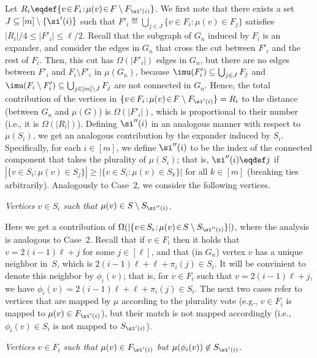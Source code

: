 Let $R_i\eqdef\{v\!\in\!F_i\!:\!\mu(v)\!\in\!F\setminus F_{\si'(i)}\}$.
We first note that there exists a set $J\subseteq[m]\setminus\{\si'(i)\}$
such that $F'_i\eqdef\bigcup_{j\in J}\{v\!\in\!F_i\!:\!\mu(v)\!\in\!F_j\}$
satisfies $|R_i|/4\leq|F'_i|\leq\ell/2$.
%
%
%
%
%
%
%
%
%
%
%
%
%
%
%
%
%
%
%
Recall that the subgraph of $G_n$ induced by $F_i$ is an expander,
and consider the edges in $G_n$ that cross the cut
between $F'_i$ and the rest of $F_i$. 
Then, this cut has $\Omega(|F'_i|)$ edges in $G_n$,
but there are no edges between $F'_i$ and $F_i\setminus F'_i$ in $\mu(G_n)$,
because $\imu(F'_i)\subseteq\bigcup_{j\in J}F_j$
and $\imu(F_i\setminus F'_i)\subseteq\bigcup_{j\in[m]\setminus J}F_j$
are not connected in $G_n$.
%
%
%
%
%
%
Hence, the total contribution of the vertices
in $\{v\!\in\!F_i\!:\!\mu(v)\!\in\!F\setminus F_{\si'(i)}\}=R_i$
to the distance (between $G_n$ and $\mu(G)$) is $\Omega(|F'_i|)$,
which is proportional to their number
(i.e., it is $\Omega(|R_i|)$).
%
\EDes
Defining $\si''(i)$ in an analogous manner with respect to $\mu(S_i)$,
we get an analogous contribution by the expander induced by $S_i$.
Specifically, for each $i\in[m]$, we define $\si''(i)$ to be the index
of the connected component that takes the plurality of $\mu(S_i)$;
that is, $\si''(i)\eqdef j$ if
$|\{v\!\in\!S_i\!:\!\mu(v)\!\in\!S_j\}|
  \geq|\{v\!\in\!S_i\!:\!\mu(v)\!\in\!S_k\}|$
for all $k\in[m]$ (breaking ties arbitrarily).
Analogously to Case~2, we consider the following vertices.

\BDes
\item[{\em Case 3}:]
{\em Vertices $v\in S_i$ such that $\mu(v)\in S\setminus S_{\si''(i)}$}.

Here we get a contribution of
$\Omega(|\{v\!\in\!S_i\!:\!\mu(v)\!\in\!S\setminus S_{\si''(i)}\}|)$,
where the analysis is analogous to Case~2.
\EDes
Recall that if $v\in F_i$ then it holds that $v=2(i-1)\ell+j$
for some $j\in[\ell]$, and that (in $G_n$) vertex $v$ has
a unique neighbor in~$S$, which is $2(i-1)\ell+\ell+\pi_i(j)\in S_i$.
It will be convinient to denote this neighbor by $\phi_i(v)$;
that is, for $v\in F_i$ such that $v=2(i-1)\ell+j$,
we have $\phi_i(v)=2(i-1)\ell+\ell+\pi_i(j)\in S_i$.
The next two cases refer to vertices that are mapped by $\mu$
according to the plurality vote
(e.g., $v\in F_i$ is mapped to $\mu(v)\in F_{\si'(i)}$),
but their match is not mapped accordingly
(i.e., $\phi_i(v)\in S_i$ is not mapped to $S_{\si'(i)}$).

\BDes
\item[{\em Case 4}:]
{\em Vertices $v\in F_i$ such that $\mu(v)\in F_{\si'(i)}$
but $\mu(\phi_i(v))\not\in S_{\si'(i)}$}.
%
%
%


